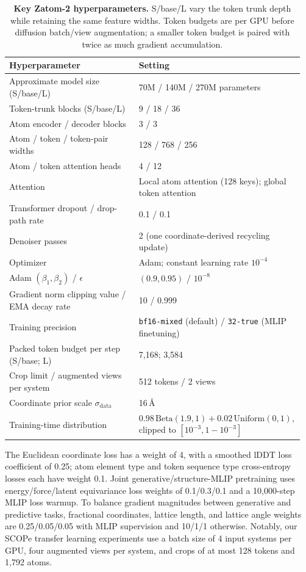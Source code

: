 \documentclass{article} %
\begin{document}
\begin{table}[htbp]
  \centering
  \small
  \caption{\textbf{Key Zatom-2 hyperparameters.} S/base/L vary the token trunk depth while retaining the same feature widths. Token budgets are per GPU before diffusion batch/view augmentation; a smaller token budget is paired with twice as much gradient accumulation.}
  \label{tab:zatom2-hyperparameters}
  \vspace{0.4em}
  \begin{tabular}{@{}p{0.43\linewidth}p{0.53\linewidth}@{}}
    \toprule
    Hyperparameter & Setting \\
    \midrule
    Approximate model size (S/base/L) & 70M / 140M / 270M parameters \\
    Token-trunk blocks (S/base/L) & 9 / 18 / 36 \\
    Atom encoder / decoder blocks & 3 / 3 \\
    Atom / token / token-pair widths & 128 / 768 / 256 \\
    Atom / token attention heads & 4 / 12 \\
    Attention & Local atom attention (128 keys); global token attention \\
    Transformer dropout / drop-path rate & 0.1 / 0.1 \\
    Denoiser passes & 2 (one coordinate-derived recycling update) \\
    Optimizer & Adam; constant learning rate $10^{-4}$ \\
    Adam $(\beta_1,\beta_2)$ / $\epsilon$ & $(0.9,0.95)$ / $10^{-8}$ \\
    Gradient norm clipping value / EMA decay rate & 10 / 0.999 \\
    Training precision & \texttt{bf16-mixed} (default) / \texttt{32-true} (MLIP finetuning) \\
    Packed token budget per step (S/base; L) & 7,168; 3,584 \\
    Crop limit / augmented views per system & 512 tokens / 2 views \\
    Coordinate prior scale $\sigma_{\mathrm{data}}$ & 16\,\AA \\
    Training-time distribution & $0.98\,\mathrm{Beta}(1.9,1)+0.02\,\mathrm{Uniform}(0,1)$,
      clipped to $[10^{-3},1-10^{-3}]$ \\
    \bottomrule
  \end{tabular}
\end{table}

The Euclidean coordinate loss has a weight of 4, with a smoothed lDDT loss coefficient of 0.25; atom element type and token sequence type cross-entropy losses each have weight 0.1. Joint generative/structure-MLIP pretraining uses energy/force/latent equivariance loss weights of 0.1/0.3/0.1 and a 10,000-step MLIP loss warmup. To balance gradient magnitudes between generative and predictive tasks, fractional coordinates, lattice length, and lattice angle weights are 0.25/0.05/0.05 with MLIP supervision and 10/1/1 otherwise. Notably, our SCOPe transfer learning experiments use a batch size of 4 input systems per GPU, four augmented views per system, and crops of at most 128 tokens and 1,792 atoms.
\end{document}
